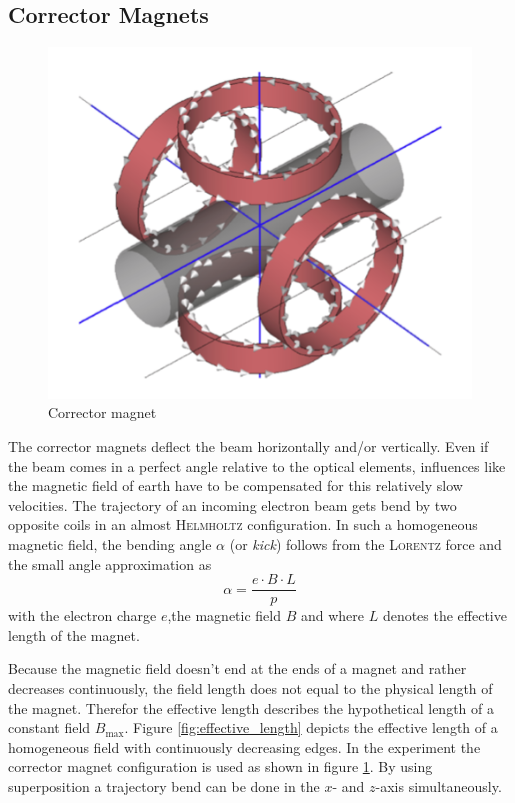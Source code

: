 \documentclass[11pt,a4paper,notitlepage]{scrartcl}
\begin{document}
\subsection{Corrector Magnets}
\begin{figure}
	\vspace{-1cm}
	\includegraphics[width=\linewidth]{figs/corrector_magnets.png}
	\caption{Corrector magnet \cite{script}}\label{fig:corrector_magnets}
\end{figure}
The corrector magnets deflect the beam horizontally and/or vertically. Even if the beam comes in a perfect angle relative to the optical elements, influences like the magnetic field of earth have to be compensated for this relatively slow velocities. The trajectory of an incoming electron beam gets bend by two opposite coils in an almost \textsc{Helmholtz} configuration. In such a homogeneous magnetic field, the bending angle $\alpha$ (or \emph{kick}) follows from the \textsc{Lorentz} force  and the small angle approximation as 
$$\alpha=\frac{e\cdot B\cdot L}{p}$$ with the electron charge $e$,the magnetic field $B$ and where $L$ denotes the effective length of the magnet.

Because the magnetic field doesn't end at the ends of a magnet and rather decreases continuously, the field length does not equal to the physical length of the magnet. Therefor the effective length describes the hypothetical length of a constant field $B_\text{max}$. Figure \ref{fig:effective_length} depicts the effective length of a homogeneous field with continuously decreasing edges. In the experiment the corrector magnet configuration is used as shown in figure \ref{fig:corrector_magnets}. By using superposition a trajectory bend can be done in the $x$- and $z$-axis simultaneously.
\end{document}
